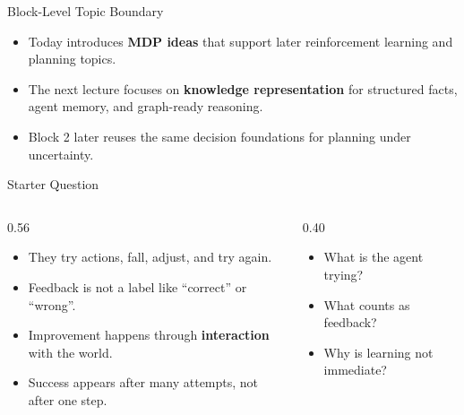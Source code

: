 \documentclass[aspectratio=169]{beamer}
\newcommand{\defaultdeckrefs}{AIMA4e Ch.22 pp.789--822; Poole3e Ch.13 pp.583--608}
\newcommand{\currentsliderefs}{\defaultdeckrefs}
\newcommand{\setslideref}[1]{\gdef\currentsliderefs{#1}}
\begin{document}
\setslideref{AIMA4e Ch.17 -- Making Complex Decisions; Poole3e Ch.12 -- Planning with Uncertainty}
\begin{frame}{Block-Level Topic Boundary}
\begin{itemize}
  \item Today introduces \textbf{MDP ideas} that support later reinforcement learning and planning topics.
  \item The next lecture focuses on \textbf{knowledge representation} for structured facts, agent memory, and graph-ready reasoning.
  \item Block 2 later reuses the same decision foundations for planning under uncertainty.
\end{itemize}
\end{frame}

\setslideref{AIMA4e Ch.22 pp.789--822; Poole3e Ch.13 pp.583--608}
\begin{frame}{Starter Question}
\begin{columns}[T,onlytextwidth]
  \begin{column}{0.56\textwidth}
    \begin{itemize}
      \item They try actions, fall, adjust, and try again.
      \item Feedback is not a label like ``correct'' or ``wrong''.
      \item Improvement happens through \textbf{interaction} with the world.
      \item Success appears after many attempts, not after one step.
    \end{itemize}
  \end{column}
  \begin{column}{0.40\textwidth}
    \begin{tcolorbox}[colback=plainbg,colframe=plainframe,boxrule=0.7pt,title=Think Before We Formalise RL]
    \begin{itemize}
      \item What is the agent trying?
      \item What counts as feedback?
      \item Why is learning not immediate?
    \end{itemize}
    \end{tcolorbox}
  \end{column}
\end{columns}
\end{frame}
\end{document}
